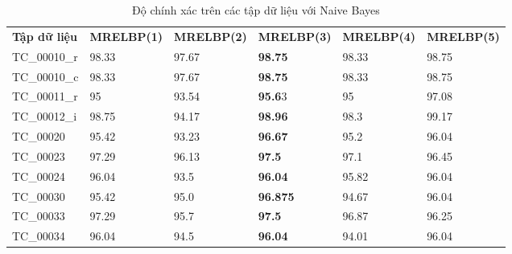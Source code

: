 \begin{table}[!ht]
	\centering
	\renewcommand{\arraystretch}{1.3}
	\caption{Độ chính xác trên các tập dữ liệu với Naive Bayes}
	\begin{tabular}{|p{2.5cm} p{2.5cm} p{2.5cm} p{2.5cm} p{2.5cm} p{2.5cm}|}
		\hline
		\rowcolor{gray!30}
		\textbf{Tập dữ liệu} & \textbf{MRELBP(1)}  & \textbf{MRELBP(2)} & \textbf{MRELBP(3) } &  \textbf{MRELBP(4)} & \textbf{MRELBP(5)}  \\
		TC\_00010\_r & 98.33 &97.67 & \textbf{98.75} & 98.33 & 98.75
		\\ \hline
		TC\_00010\_c & 98.33 & 97.67 & \textbf{98.75} & 98.33 & 98.75
		\\ \hline
		TC\_00011\_r & 95 & 93.54 & \textbf{95.6}3 & 95 & 97.08
		\\ \hline
		TC\_00012\_i & 98.75 & 94.17 & \textbf{98.96} & 98.3 & 99.17
		\\ \hline
		TC\_00020 & 95.42 & 93.23 & \textbf{96.67 }& 95.2 & 96.04
		\\ \hline
		TC\_00023 & 97.29 & 96.13 & \textbf{97.5} & 97.1 & 96.45
		\\ \hline
		TC\_00024 & 96.04 & 93.5 & \textbf{96.04} & 95.82 & 96.04
		\\ \hline
		TC\_00030 & 95.42 & 95.0 & \textbf{96.875} & 94.67 & 96.04
		\\ \hline
		TC\_00033 & 97.29 & 95.7 & \textbf{97.5} & 96.87 & 96.25
		\\ \hline
		TC\_00034 & 96.04 & 94.5 & \textbf{96.04} & 94.01 & 96.04
		\\ \hline
	\end{tabular}
	
	\label{tab:nb}
\end{table}



